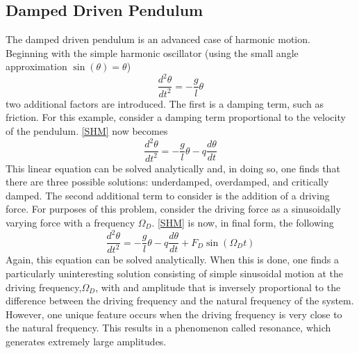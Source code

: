 \documentclass[12pt]{article}
\begin{document}
\subsection{Damped Driven Pendulum}
The damped driven pendulum is an advanced case of harmonic motion.  Beginning with the simple harmonic oscillator (using the small angle approximation $\sin{(\theta)} = \theta$)
\begin{equation}
\label{SHM}
\frac{d^2\theta}{dt^2} = -\frac{g}{l}\theta
\end{equation}
two additional factors are introduced.  The first is a damping term, such as friction.  For this example, consider a damping term proportional to the velocity of the pendulum.  \eqref{SHM} now becomes
\begin{equation}
\label{SHMdamp}
\frac{d^2\theta}{dt^2} = -\frac{g}{l}\theta-q \frac{d \theta}{dt}
\end{equation}
This linear equation can be solved analytically and, in doing so, one finds that there are three possible solutions:  underdamped, overdamped, and critically damped.  The second additional term to consider is the addition of a driving force.  For purposes of this problem, consider the driving force as a sinusoidally varying force with a frequency $\Omega_D$.  \eqref{SHM} is now, in final form, the following
\begin{equation}
\label{SHMdampdrive}
\frac{d^2\theta}{dt^2} = -\frac{g}{l}\theta-q \frac{d \theta}{dt} + F_D \sin{(\Omega_D t)}
\end{equation}
Again, this equation can be solved analytically.  When this is done, one finds a particularly uninteresting solution consisting of simple sinusoidal motion at the driving frequency,$\Omega_D$, with and amplitude that is inversely proportional to the difference between the driving frequency and the natural frequency of the system.  However, one unique feature occurs when the driving frequency is very close to the natural frequency.  This results in a phenomenon called resonance, which generates extremely large amplitudes.
\end{document}
